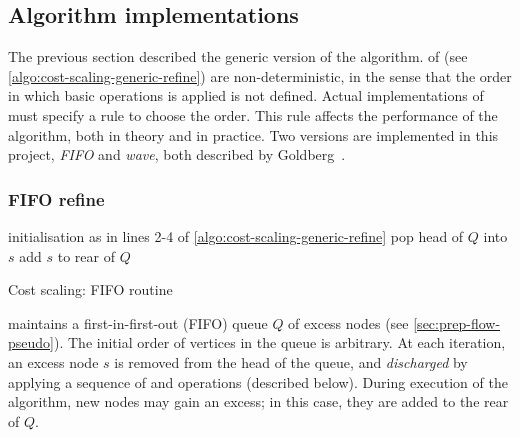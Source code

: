 \subsection{Algorithm implementations} \label{sec:impl-cost-scaling-implementations}

The previous section described the generic version of the algorithm.   of  (see \cref{algo:cost-scaling-generic-refine}) are non-deterministic, in the sense that the order in which basic operations is applied is not defined. Actual implementations of  must specify a rule to choose the order. This rule affects the performance of the algorithm, both in theory and in practice. Two versions are implemented in this project, \textit{FIFO} and \textit{wave}, both described by Goldberg~\cite{Goldberg:1990}.

\subsubsection{FIFO refine}

\begin{algorithm}
\begin{algorithmic}[1]
        \State initialisation as in lines 2-4 of \cref{algo:cost-scaling-generic-refine}
         
            \State pop head of $Q$ into $s$
            \State {} 
                \State add $s$ to rear of $Q$
                \Break
            \EndIf
        \EndWhile
    \EndFunction
\end{algorithmic}
\caption{Cost scaling: FIFO  routine}
\label{algo:cost-scaling-first-active-refine}
\end{algorithm}

 maintains a first-in-first-out (FIFO) queue $Q$ of excess nodes (see \cref{sec:prep-flow-pseudo}). The initial order of vertices in the queue is arbitrary. At each iteration, an excess node $s$ is removed from the head of the queue, and \emph{discharged} by applying a sequence of  and  operations (described below). During execution of the algorithm, new nodes may gain an excess; in this case, they are added to the rear of $Q$.


